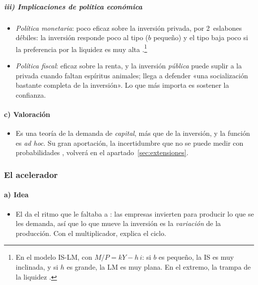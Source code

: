 \documentclass[11pt]{article}
\begin{document}
\subparagraph{iii) Implicaciones de política económica}

\begin{itemize}
\item \emph{Política monetaria}: poco eficaz sobre la inversión privada, por 2~eslabones débiles: la inversión responde poco al tipo ($b$ pequeño) y el tipo baja poco si la preferencia por la liquidez es muy alta .\footnote{En el modelo IS-LM, con $M/P=kY-h\,i$: si $b$ es pequeño, la IS es muy inclinada, y si $h$ es grande, la LM es muy plana. En el extremo, la trampa de la liquidez .}
\item \emph{Política fiscal}: eficaz sobre la renta, y la inversión \emph{pública} puede suplir a la privada cuando faltan espíritus animales; \textcite[cap.~24; traducción propia]{Keynes1936} llega a defender «una socialización bastante completa de la inversión». Lo que más importa es sostener la confianza.
\end{itemize}

\paragraph{c) Valoración}

\begin{itemize}
\item Es una teoría de la demanda de \emph{capital}, más que de la inversión, y la función es \emph{ad hoc}. Su gran aportación, la incertidumbre que no se puede medir con probabilidades\nocite{Keynes1937General,Knight1921Risk} , volverá en el apartado~\ref{sec:extensiones}.
\end{itemize}

\subsubsection{El acelerador}\label{sec:acelerador}

\paragraph{a) Idea}

\begin{itemize}
\item El \nocite{Clark1917Business} da el ritmo que le faltaba a : las empresas invierten para producir lo que se les demanda, así que lo que mueve la inversión es la \emph{variación} de la producción. Con el multiplicador, explica el ciclo\nocite{Samuelson1939Interactions,Hicks1950Contribution}.
\end{itemize}
\end{document}
